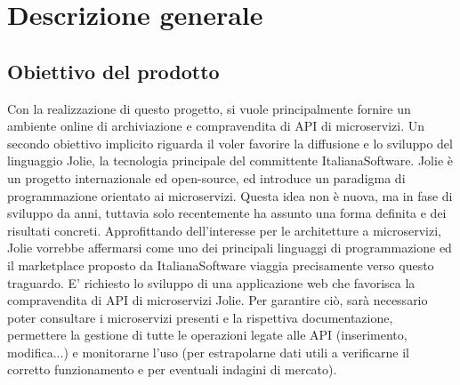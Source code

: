 \newpage
\section{Descrizione generale}
\subsection{Obiettivo del prodotto}
Con la realizzazione di questo progetto, si vuole principalmente fornire un ambiente online di archiviazione e compravendita di API di microservizi. Un secondo obiettivo implicito riguarda il voler favorire la diffusione e lo sviluppo del linguaggio Jolie, la tecnologia principale del committente ItalianaSoftware. Jolie è un progetto internazionale ed open-source, ed introduce un paradigma di programmazione orientato ai microservizi. Questa idea non è nuova, ma in fase di sviluppo da anni, tuttavia solo recentemente ha assunto una forma definita e dei risultati concreti. Approfittando dell'interesse per le architetture a microservizi, Jolie vorrebbe affermarsi come uno dei principali linguaggi di programmazione ed il marketplace proposto da ItalianaSoftware viaggia precisamente verso questo traguardo. E' richiesto lo sviluppo di una applicazione web che favorisca la compravendita di API di microservizi Jolie. Per garantire ciò, sarà necessario poter consultare i microservizi presenti e la rispettiva documentazione, permettere la gestione di tutte le operazioni legate alle API (inserimento, modifica...) e monitorarne l'uso (per estrapolarne dati utili a verificarne il corretto funzionamento e per eventuali indagini di mercato).

